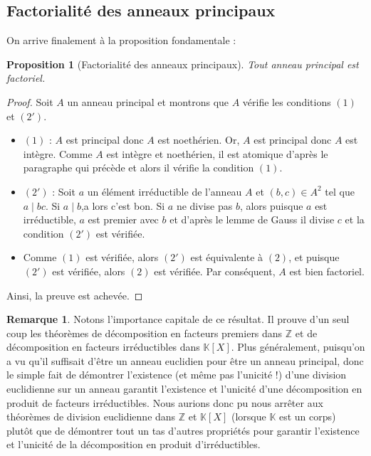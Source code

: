 \documentclass[french]{book}
\newcommand{\Z}{\mathbb{Z}}
\newcommand{\K}{\mathbb{K}}
\theoremstyle{plain}
\newtheorem{prop}{Proposition}[chapter]
\theoremstyle{definition}
\newtheorem{rmq}{Remarque}[chapter]
\theoremstyle{remark}
\begin{document}
\subsection{Factorialité des anneaux principaux}
On arrive finalement à la proposition fondamentale : 
\begin{prop}[Factorialité des anneaux principaux]
	Tout anneau principal est factoriel.
\end{prop}
\begin{proof}
	Soit $A$ un anneau principal et montrons que $A$ vérifie les conditions $(1)$ et $(2')$.
	\begin{itemize}
		\item $(1)$ : $A$ est principal donc $A$ est noethérien. Or, $A$ est principal donc $A$ est intègre. Comme $A$ est intègre et noethérien, il est atomique d'après le paragraphe qui précède et alors il vérifie la condition $(1)$.
		\item $(2')$ : Soit $a$ un élément irréductible de l'anneau $A$ et $(b,c)\in A^2$ tel que $a\mid bc$. Si $a\mid b$,a lors c'est bon. Si $a$ ne divise pas $b$, alors puisque $a$ est irréductible, $a$ est premier avec $b$ et d'après le lemme de Gauss il divise $c$ et la condition $(2')$ est vérifiée.
		\item Comme $(1)$ est vérifiée, alors $(2')$ est équivalente à $(2)$, et puisque $(2')$ est vérifiée, alors $(2)$ est vérifiée. Par conséquent, $A$ est bien factoriel.
	\end{itemize}
	Ainsi, la preuve est achevée. 
\end{proof}
\begin{rmq}
	Notons l'importance capitale de ce résultat. Il prouve d'un seul coup les théorèmes de décomposition en facteurs premiers dans $\Z$ et de décomposition en facteurs irréductibles dans $\K[X]$. Plus généralement, puisqu'on a vu qu'il suffisait d'être un anneau euclidien pour être un anneau principal, donc le simple fait de démontrer l'existence (et même pas l'unicité !) d'une division euclidienne sur un anneau garantit l'existence et l'unicité d'une décomposition en produit de facteurs irréductibles. Nous aurions donc pu nous arrêter aux théorèmes de division euclidienne dans $\Z$ et $\K[X]$ (lorsque $\K$ est un corps) plutôt que de démontrer tout un tas d'autres propriétés pour garantir l'existence et l'unicité de la décomposition en produit d'irréductibles.
\end{rmq}
\end{document}
